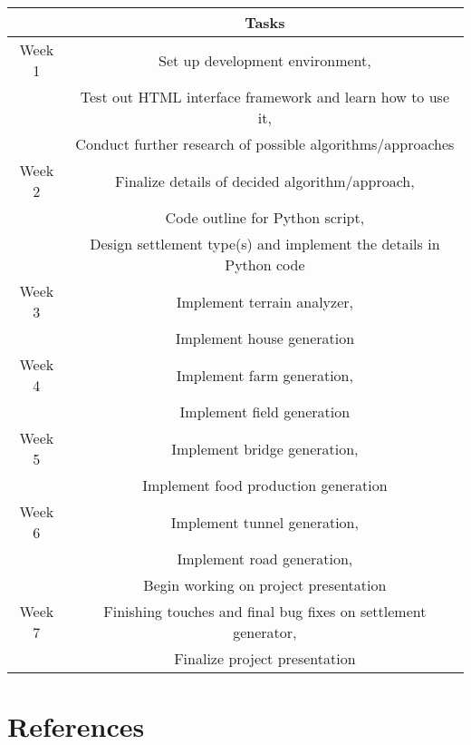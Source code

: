 \documentclass[11pt, oneside]{article}
\begin{document}
\begin{center}
\begin{tabular}{| c | c |} 
 	\hline
 	  & Tasks \\ [0.5ex] 
 	\hline\hline
	Week 1 & Set up development environment, \\
	 & Test out HTML interface framework and learn how to use it, \\
	 & Conduct further research of possible algorithms/approaches \\
	\hline
	Week 2 & Finalize details of decided algorithm/approach, \\
	 & Code outline for Python script, \\
	 & Design settlement type(s) and implement the details in Python code \\
	\hline
	Week 3 & Implement terrain analyzer, \\ 
	 & Implement house generation \\
	\hline
	Week 4 & Implement farm generation, \\ 
	 & Implement field generation \\
	\hline
	Week 5 & Implement bridge generation, \\
	 & Implement food production generation \\
	\hline
	Week 6 & Implement tunnel generation, \\
	 & Implement road generation, \\
	 & Begin working on project presentation \\
	\hline
	Week 7 & Finishing touches and final bug fixes on settlement generator, \\
	 & Finalize project presentation \\
	\hline
\end{tabular}
\end{center}

\newpage


\section{References}
\label{references}
\nocite{*}
\printbibliography[heading=none]
\end{document}
